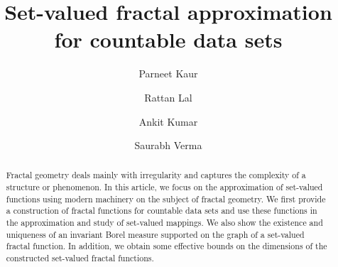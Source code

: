 \documentclass[12pt,oneside,reqno]{amsart}
\theoremstyle{definition}
\theoremstyle{remark}
\begin{document}
\title[Set-valued fractal approximation ]{Set-valued fractal approximation for countable data sets}





\author{Parneet Kaur}
\address{Department of Mathematics, 
Punjab Engineering college
(Deemed to be University), 
Sector 12 Chandigarh 160012, India}



\author{Rattan Lal}
\address{Department of Mathematics, 
Punjab Engineering college
(Deemed to be University), 
Sector 12 Chandigarh 160012, India}


\author{Ankit Kumar}
\address{Department of Mathematics, 
Punjab Engineering college
(Deemed to be University), 
Sector 12 Chandigarh 160012, India}
\author{Saurabh Verma}
\address{Department of Applied Sciences, IIIT Allahabad, Prayagraj, India 211015}







 

\begin{abstract} 
Fractal geometry deals mainly with irregularity and captures the complexity of a structure or phenomenon. In this article, we focus on the approximation of set-valued functions using modern machinery on the subject of fractal geometry. We first provide a construction of fractal functions for countable data sets and use these functions in the approximation and study of set-valued mappings. We also show the existence and uniqueness of an invariant Borel measure supported on the graph of a set-valued fractal function. In addition, we obtain some effective bounds on the dimensions of the constructed set-valued fractal functions.

\end{abstract}
\end{document}

